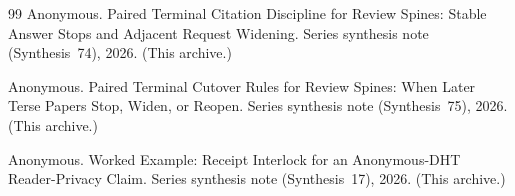 \documentclass[11pt]{article}
\begin{document}
\begin{thebibliography}{99}
Anonymous.
\newblock Paired Terminal Citation Discipline for Review Spines: Stable Answer Stops and Adjacent Request Widening.
\newblock Series synthesis note (Synthesis~74), 2026. (This archive.)

Anonymous.
\newblock Paired Terminal Cutover Rules for Review Spines: When Later Terse Papers Stop, Widen, or Reopen.
\newblock Series synthesis note (Synthesis~75), 2026. (This archive.)

Anonymous.
\newblock Worked Example: Receipt Interlock for an Anonymous-DHT Reader-Privacy Claim.
\newblock Series synthesis note (Synthesis~17), 2026. (This archive.)

\end{thebibliography}
\end{document}
